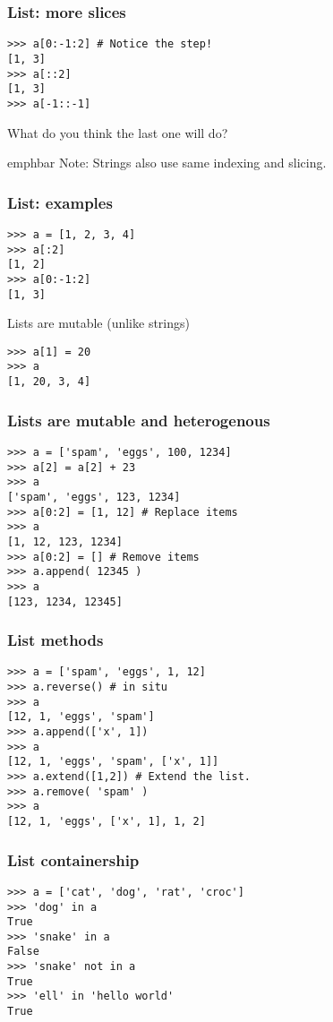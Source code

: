 \documentclass[14pt,compress]{beamer}
\newcommand{\emphbar}[1]
{\begin{beamercolorbox}[rounded=true]{emphbar} 
      {#1}
 \end{beamercolorbox}
}
\newcounter{time}
\newcommand{\inctime}[1]{\addtocounter{time}{#1}{\tiny \thetime\ m}}
\begin{document}
\begin{frame}[fragile]
  \frametitle{List: more slices}
\begin{lstlisting}
>>> a[0:-1:2] # Notice the step!
[1, 3]
>>> a[::2]
[1, 3]
>>> a[-1::-1]
\end{lstlisting}
What do you think the last one will do?
  \emphbar{Note: Strings also use same indexing and slicing.}
\end{frame}

\begin{frame}[fragile]
  \frametitle{List: examples}
\begin{lstlisting}
>>> a = [1, 2, 3, 4]
>>> a[:2]
[1, 2]
>>> a[0:-1:2]
[1, 3]
\end{lstlisting}
\pause
\alert{Lists are mutable (unlike strings)}
\begin{lstlisting}
>>> a[1] = 20
>>> a
[1, 20, 3, 4]
\end{lstlisting}
\end{frame}

\begin{frame}[fragile]
  \frametitle{Lists are mutable and heterogenous}
\begin{lstlisting}
>>> a = ['spam', 'eggs', 100, 1234]
>>> a[2] = a[2] + 23
>>> a
['spam', 'eggs', 123, 1234]
>>> a[0:2] = [1, 12] # Replace items
>>> a
[1, 12, 123, 1234]
>>> a[0:2] = [] # Remove items
>>> a.append( 12345 )
>>> a
[123, 1234, 12345]
\end{lstlisting}
\inctime{10}
\end{frame}


\begin{frame}[fragile]
  \frametitle{List methods}
\begin{lstlisting}
>>> a = ['spam', 'eggs', 1, 12]
>>> a.reverse() # in situ
>>> a
[12, 1, 'eggs', 'spam']
>>> a.append(['x', 1])
>>> a
[12, 1, 'eggs', 'spam', ['x', 1]]
>>> a.extend([1,2]) # Extend the list.
>>> a.remove( 'spam' )
>>> a
[12, 1, 'eggs', ['x', 1], 1, 2]
\end{lstlisting}
\end{frame}

\begin{frame}[fragile]
  \frametitle{List containership}
  \begin{lstlisting}
>>> a = ['cat', 'dog', 'rat', 'croc']
>>> 'dog' in a
True
>>> 'snake' in a
False
>>> 'snake' not in a
True
>>> 'ell' in 'hello world'
True
  \end{lstlisting}
  \inctime{5}
\end{frame}
\end{document}
